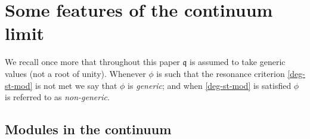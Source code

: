 \documentclass[a4paper,10pt]{article}
\newcommand{\q}{\mathfrak{q}}
\newcommand{\linnea}[1]{$\framebox{\tiny L}$\ \textbf{\texttt{{\color{red}\footnotesize#1}}}}
\newcommand{\jesper}[1]{$\framebox{\tiny J}$\ \textbf{\texttt{{\color{cyan}\footnotesize#1}}}}
\newcommand{\bAStTL}[2]{\overline{\mathcal{W}}_{#1,#2}}
\newcommand{\Verma}[1]{\mathsf{V}_{#1}}
\newcommand{\FF}[1]{\widetilde{\mathsf{V}}_{#1}}
\begin{document}
%
%
%
%

\section{Some features of the continuum limit}\label{sec:contlim}

We recall once more that throughout this paper $\q$ is assumed to take generic values (not a root of unity).
Whenever $\phi$ is such that the resonance criterion \eqref{deg-st-mod} is not met we say that $\phi$ is {\em generic};
and when \eqref{deg-st-mod} is satisfied $\phi$ is referred to as {\em non-generic}.

\subsection{Modules in the continuum}


\end{document}
